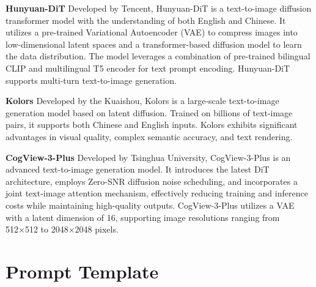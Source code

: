\textbf{Hunyuan-DiT} \cite{tencent2024hunyuan-dit} Developed by Tencent, Hunyuan-DiT is a text-to-image diffusion transformer model with the understanding of both English and Chinese. It utilizes a pre-trained Variational Autoencoder (VAE) to compress images into low-dimensional latent spaces and a transformer-based diffusion model to learn the data distribution. The model leverages a combination of pre-trained bilingual CLIP and multilingual T5 encoder for text prompt encoding. Hunyuan-DiT supports multi-turn text-to-image generation.

\textbf{Kolors} \cite{kolors2024} Developed by the Kuaishou, Kolors is a large-scale text-to-image generation model based on latent diffusion. Trained on billions of text-image pairs, it supports both Chinese and English inputs. Kolors exhibits significant advantages in visual quality, complex semantic accuracy, and text rendering.

\textbf{CogView-3-Plus} \cite{thudm2024cogview3plus} Developed by Tsinghua University, CogView-3-Plus is an advanced text-to-image generation model. It introduces the latest DiT architecture, employs Zero-SNR diffusion noise scheduling, and incorporates a joint text-image attention mechanism, effectively reducing training and inference costs while maintaining high-quality outputs. CogView-3-Plus utilizes a VAE with a latent dimension of 16, supporting image resolutions ranging from 512×512 to 2048×2048 pixels.


\section{Prompt Template}
